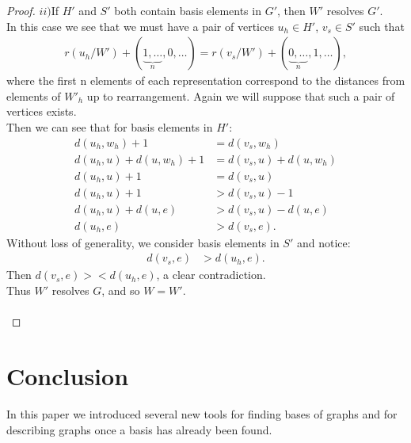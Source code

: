 \documentclass[11pt]{amsart}
\theoremstyle{plain}  %
\newtheorem{lem}[thm]{Lemma}
\theoremstyle{definition}
\theoremstyle{remark}
\numberwithin{equation}{thm}
\begin{document}
\begin{proof}
$ii)$If $H'$ and $S'$ both contain basis elements in $G'$, then $W'$ resolves $G'$.\\ 
In this case we see that we must have a pair of vertices $u_h \in H'$, $v_s\in S'$ such that
\begin{align*}
 r(u_h/W') + (\underbrace{1,\dots}_{n},0,\dots) = r(v_s/W') + (\underbrace{0,\dots}_{n},1,\dots),
\end{align*}
where the first n elements of each representation correspond to the distances from elements of $W'_h$ up to rearrangement. 
Again we will suppose that such a pair of vertices exists.\\ 
Then we can see that for basis elements in $H'$:
\begin{align*}
d(u_h, w_h) + 1 &= d(v_s,w_h)\\
d(u_h, u) + d(u, w_h) + 1 &= d(v_s, u) + d(u, w_h)\\
d(u_h, u) + 1 &= d(v_s, u)\\
d(u_h, u) + 1 &> d(v_s, u) - 1\\
d(u_h, u) + d(u, e) &> d(v_s, u) - d(u, e)\\
d(u_h, e) &> d(v_s, e).
\end{align*}
Without loss of generality, we consider basis elements in $S'$ and notice:
\begin{align*}
 d(v_s, e) &> d(u_h, e).
\end{align*}
Then $d(v_s, e) >< d(u_h, e)$, a clear contradiction.\\
Thus $W'$ resolves $G$, and so $W = W'$.\\ \\
\end{proof}


 




\section{Conclusion}
In this paper we introduced several new tools for finding bases of graphs and for describing graphs once a basis has already been found.
\cite{Chartrand:2010:GDF:1941879}

\nocite{*}

\end{document}
